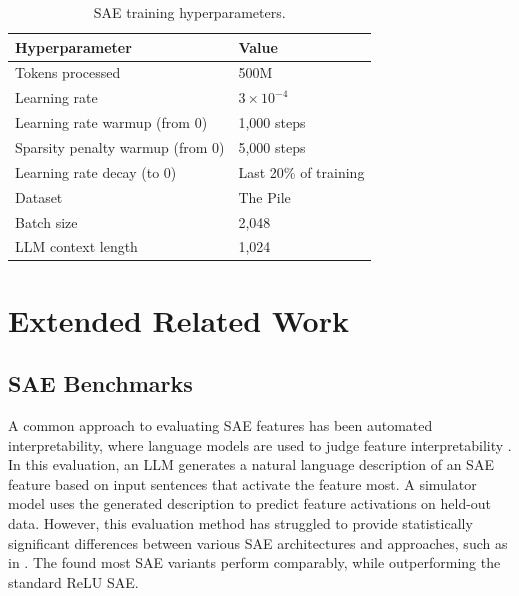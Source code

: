\documentclass{article}
\theoremstyle{plain}
\theoremstyle{definition}
\theoremstyle{remark}
\begin{document}
\begin{table}[h!]
    \centering
    \begin{tabular}{|l|l|}
        \hline
        \textbf{Hyperparameter}        & \textbf{Value}                  \\ \hline
        Tokens processed               & 500M                            \\ \hline
        Learning rate                  & $3 \times 10^{-4}$              \\ \hline
        Learning rate warmup (from 0)           & 1,000 steps                     \\ \hline
        Sparsity penalty warmup (from 0)        & 5,000 steps                     \\ \hline
        Learning rate decay (to 0)           & Last 20\% of training           \\ \hline
        Dataset                        & The Pile                        \\ \hline
        Batch size                     & 2,048                           \\ \hline
        LLM context length             & 1,024                           \\ \hline
    \end{tabular}
    \caption{SAE training hyperparameters.}
    \label{tab:sae-training-hyperparameters}
\end{table}

\section{Extended Related Work}
\label{app:related_work}


\subsection{SAE Benchmarks}

A common approach to evaluating SAE features has been automated interpretability, where language models are used to judge feature interpretability \cite{paulo2024automaticallyinterpretingmillionsfeatures, rajamanoharan2024improving}. In this evaluation, an LLM generates a natural language description of an SAE feature based on input sentences that activate the feature most. A simulator model uses the generated description to predict feature activations on held-out data. However, this evaluation method has struggled to provide statistically significant differences between various SAE architectures and approaches, such as in \citet{rajamanoharan2024improving}. The \citet{circuits2024august} found most SAE variants perform comparably, while outperforming the standard ReLU SAE.
\end{document}
